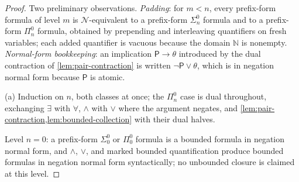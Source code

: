 \documentclass[11pt,oneside,openany]{book}
\theoremstyle{definition}
\theoremstyle{plain}
\theoremstyle{remark}
\newcommand{\N}{\mathbb{N}}
\begin{document}
\begin{proof}
Two preliminary observations.  \emph{Padding}: for \(m<n\), every
prefix-form formula of level \(m\) is \(\mathcal N\)-equivalent to a
prefix-form \(\Sigma^0_n\) formula and to a prefix-form \(\Pi^0_n\)
formula, obtained by prepending and interleaving quantifiers on fresh
variables; each added quantifier is vacuous because the domain \(\N\) is
nonempty.  \emph{Normal-form bookkeeping}: an implication
\(\mathsf P\to\theta\) introduced by the dual contraction of
\cref{lem:pair-contraction} is written \(\neg\mathsf P\lor\theta\), which
is in negation normal form because \(\mathsf P\) is atomic.

(a) Induction on \(n\), both classes at once; the \(\Pi^0_n\) case is dual
throughout, exchanging \(\exists\) with \(\forall\), \(\land\) with
\(\lor\) where the argument negates, and
\cref{lem:pair-contraction,lem:bounded-collection} with their dual halves.

Level \(n=0\): a prefix-form \(\Sigma^0_0\) or \(\Pi^0_0\) formula is a
bounded formula in negation normal form, and \(\land\), \(\lor\), and
marked bounded quantification produce bounded formulas in negation normal
form syntactically; no unbounded closure is claimed at this level.


\end{proof}
\end{document}
